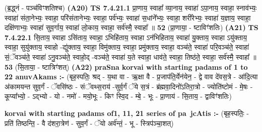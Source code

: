 \documentclass[17pt]{extarticle}
\begin{document}
                  \newline
                      (ब्र॒द्ध्नं - पञ्च॑विꣳशतिश्च)  \textbf{(A20)} \newline \newline
                                        \textbf{ TS 7.4.21.1} \newline
                  प्रा॒णाय॒ स्वाहा᳚ व्या॒नाय॒ स्वाहा॑ ऽपा॒नाय॒ स्वाहा॒ स्नाव॑भ्यः॒ स्वाहा॑ संता॒नेभ्यः॒ स्वाहा॒ परि॑संतानेभ्यः॒ स्वाहा॒ पर्व॑भ्यः॒ स्वाहा॑ स॒धांने᳚भ्यः॒ स्वाहा॒ शरी॑रेभ्यः॒ स्वाहा॑ य॒ज्ञाय॒ स्वाहा॒ दक्षि॑णाभ्यः॒ स्वाहा॑ सुव॒र्गाय॒ स्वाहा॑ लो॒काय॒ स्वाहा॒ सर्व॑स्मै॒ स्वाहा᳚ ॥ \textbf{  52} \newline
                  \newline
                      (प्रा॒णाया॒ - ष्टाविꣳ॑शतिः)  \textbf{(A21)} \newline \newline
                                        \textbf{ TS 7.4.22.1} \newline
                  सि॒ताय॒ स्वाहा ऽसि॑ताय॒ स्वाहा॒ ऽभिहि॑ताय॒ स्वाहा ऽन॑भिहिताय॒ स्वाहा॑ यु॒क्ताय॒ स्वाहा ऽयु॑क्ताय॒ स्वाहा॒ सुयु॑क्ताय॒ स्वाहो -द्यु॑क्ताय॒ स्वाहा॒ विमु॑क्ताय॒ स्वाहा॒ प्रमु॑क्ताय॒ स्वाहा॒ वञ्च॑ते॒ स्वाहा॑ परि॒वञ्च॑ते॒ स्वाहा॑ सं॒ॅवञ्च॑ते॒ स्वाहा॑ ऽनु॒वञ्च॑ते॒ स्वाहो॒द् -वञ्च॑ते॒ स्वाहा॑ य॒ते स्वाहा॒ धाव॑ते॒ स्वाहा॒ तिष्ठ॑ते॒ स्वाहा॒ सर्व॑स्मै॒ स्वाहा᳚ ॥ \textbf{  53} \newline
                  \newline
                      (सि॒ताया॒ - ष्टात्रिꣳ॑शत्)  \textbf{(A22)} \newline \newline
                \textbf{praSna korvai with starting padams of 1 to 22 anuvAkams :-} \newline
        (बृह॒स्पतिः॒ श्रद् - य॒था वा - ऋ॒क्षा वै - प्र॒जाप॑ति॒र्येन॑येन॒ - द्वे वाव दे॑वस॒त्रे - आ॑दि॒त्या अ॑कामयन्त सुव॒र्गं - ॅवसि॑ष्ठः - संॅवथ्स॒राय॑ -सुर्व॒र्गं ॅये स॒त्रं - ब्र॑ह्मवा॒दिनो॑ऽतिरा॒त्रो - ज्योति॑ष्टोमं - मे॒षः - कूप्या᳚भ्यो॒ - ऽद्भ्यो - यो - नमो॑ - मयो॒भूः - किꣳ स्वि॒द - म्बे॒ - भूः - प्रा॒णाय॑ - सि॒ताय॒ - द्वाविꣳ॑शतिः) \newline

        \textbf{korvai with starting padams of1, 11, 21 series of pa~jcAtis :-} \newline
        (बृह॒स्पतिः॒ - प्रति॑ तिष्ठन्ति॒ - वै द॑शरा॒त्रेण॑ - सुव॒र्गं - ॅयो अर्व॑न्तं॒ - भू - स्त्रिप॑ञ्चा॒शत्) \newline
\end{document}
